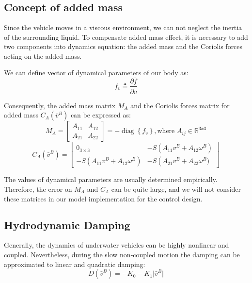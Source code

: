 \subsection{Concept of added mass}

    Since the vehicle moves in a viscous environment, we can not neglect the inertia of the surrounding liquid.
    To compensate added mass effect, it is necessary to add two components into dynamics equation: 
    the added mass and the Coriolis forces acting on the added mass.

    We can define vector of dynamical parameters of our body as:
    \begin{equation}
        f_{\dot{v}} \triangleq \frac{\partial \bar{f}}{\partial \dot{\bar{v}}}
    \end{equation}

    Consequently, the added mass matrix $M_A$ and 
    the Coriolis forces matrix for added mass $C_A(\bar v^B)$
    can be expressed as: 
    \begin{equation}
        M_A=\left[\begin{array}{cc}
            A_{11} & A_{12} \\
            A_{21} & A_{22}
            \end{array}\right]=-\operatorname{diag}\left\{f_{\dot{v}}\right\}, \textrm{where } A_{ij} \in \mathbb{R}^{3 x 3}
    \end{equation}
    \begin{equation}
        C_A(\bar{v}^B)=\left[\begin{array}{cc}
            0_{3 \times 3} & -S\left(A_{11} v^B+A_{12} \omega^B\right) \\
            -S\left(A_{11} v^B+A_{12} \omega^B\right) & -S\left(A_{21} v^B+A_{22} \omega^B)\right.
            \end{array}\right]
    \end{equation}

    The values of dynamical parameters are usually determined
    empirically. Therefore, the error on $M_A$ and $C_A$ can be quite large, and we will not consider
    these matrices in our model implementation for the control design.

\subsection{Hydrodynamic Damping}

    Generally, the dynamics of underwater vehicles can be highly nonlinear and coupled.
    Nevertheless, during the slow non-coupled motion the damping can be approximated to linear and quadratic damping:
    \begin{equation}
        D(\bar{v}^B)=-K_{0} - K_{1}\lvert \bar{v}^B \rvert
    \end{equation}

